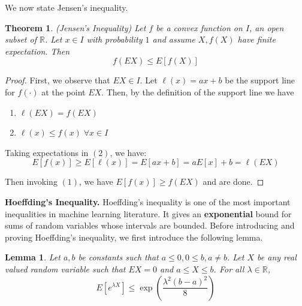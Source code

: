 \documentclass{article}
\newtheorem{thm}{Theorem}
\newtheorem*{lemma}{Lemma}
\begin{document}
We now state Jensen's inequality.

\begin{framed}
\begin{thm} (Jensen's Inequality)
Let $f$ be a convex function on $I$, an open subset of $\mathbb{R}$.
Let $x \in I$ with probability $1$ and assume $X, f(X)$ have finite expectation.
Then $$f(EX) \leq E[f(X)]$$
\end{thm}
\end{framed}

\begin{proof}
First, we observe that $EX \in I$. Let $\ell(x) = ax + b$ be the support line
for $f(\cdot)$ at the point $EX$. Then, by the definition of the support line we
have
\begin{enumerate}
    \item $\ell(EX) = f(EX)$
    \item $\ell(x) \leq f(x)\;\forall x \in I$
\end{enumerate}

Taking expectations in $(2)$, we have:
$$E[f(x)] \geq E[\ell(x)] = E[ax + b] = a E[x] + b = \ell(EX)$$

Then invoking $(1)$, we have $E[f(x)] \geq f(EX)$ and are done.
\end{proof}

\textbf{Hoeffding's Inequality.} Hoeffding's inequality is one of the most
important inequalities in machine learning literature. It gives an
\textbf{exponential} bound for sums of random variables whose intervals are
bounded. Before introducing and proving Hoeffding's inequality, we first
introduce the following lemma.

\begin{lemma}
    Let $a, b$ be constants such that $a \leq 0, 0 \leq b, a \neq b$. Let $X$
    be any real valued random variable such that $EX = 0$ and $a \leq X \leq b$.
    For all $\lambda \in \mathbb{R}$,
    $$E[e^{\lambda X}] \leq \exp(\frac{\lambda^2(b-a)^2}{8})$$
\end{lemma}
\end{document}
